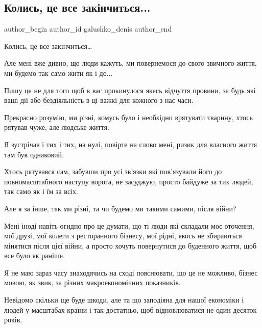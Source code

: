  
 
 
 
 

\subsection{Колись, це все закінчиться...}
\label{sec:29_04_2022.fb.galushko_denis.1.kolis__tse_vse_zak_n}

\ifcmt
 author_begin
   author_id galushko_denis
 author_end
\fi

Колись, це все закінчиться…

Але мені вже дивно, що люди кажуть, ми повернемося до свого звичного життя, ми
будемо так само жити як і до...

Пишу це не для того щоб в вас прокинулося якесь відчуття провини, за будь які
ваші дії або бездіяльність в ці важкі для кожного з нас часи.

Прекрасно розумію, ми різні, комусь було і необхідно врятувати тварину, хтось
рятував чуже, але людське життя. 

Я зустрічав і тих і тих, на нулі, повірте на слово мені, ризик для власного
життя там був однаковий. 

Хтось рятувався сам, забувши про усі зв’язки які пов’язували його до
повномасштабного наступу ворога, не засуджую, просто байдуже за тих людей, так
само як і їм за всіх.

Але я за інше, так ми різні, та чи будемо ми такими самими, після війни?

Мені іноді навіть огидно про це думати, що ті люди які складали моє оточення,
мої друзі, мої колеги з ресторанного бізнесу, мої рідні, якось не збираються
мінятися після цієї війни, а просто хочуть повернутися до буденного життя, щоб
все було як раніше.

Я не маю зараз часу знаходячись на сході пояснювати, що це не можливо, бізнес
мовою, як звик, за різних макроекономічних показників.

Невідомо скільки ще буде шкоди, але та що заподіяна для нашої економіки і людей
у масштабах країни і так достатньо, щоб відновлюватися не один десяток років.  

